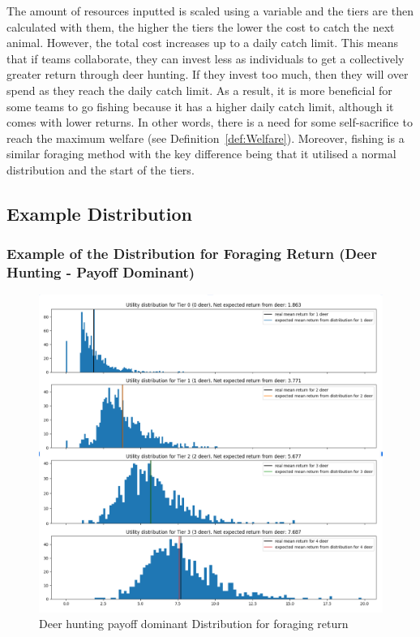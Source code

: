 The amount of resources inputted is scaled using a variable and the tiers are then calculated with them, the higher the tiers the lower the cost to catch the next animal. However, the total cost increases up to a daily catch limit. This means that if teams collaborate, they can invest less as individuals to get a collectively greater return through deer hunting. If they invest too much, then they will over spend as they reach the daily catch limit. As a result, it is more beneficial for some teams to go fishing because it has a higher daily catch limit, although it comes with lower returns. In other words, there is a need for some self-sacrifice to reach the maximum welfare (see Definition~\ref{def:Welfare}). Moreover, fishing is a similar foraging method with the key difference being that it utilised a normal distribution and the start of the tiers.

\subsection{Example Distribution}
\subsubsection{Example of the Distribution for Foraging Return (Deer Hunting - Payoff Dominant)}

\begin{figure}[!htb]
    \centering
    \includegraphics[width=1\textwidth]{04_environment/images/Distribution of Foraging returns Deer Hunting.PNG}
    \caption{Deer hunting payoff dominant Distribution for foraging return}
    \label{fig:Distribution of Foraging returns Deer Hunting}
\end{figure}

